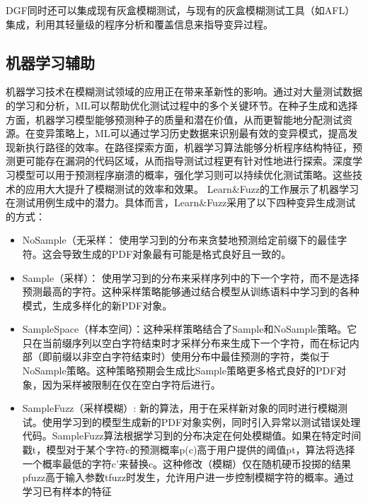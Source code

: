 \documentclass[10.5pt,compsoc]{CjC}
\theoremstyle{mystyle}
\begin{document}
DGF同时还可以集成现有灰盒模糊测试，与现有的灰盒模糊测试工具（如AFL）集成，利用其轻量级的程序分析和覆盖信息来指导变异过程\cite{Böhme}。

\vspace {10mm}

\subsection{机器学习辅助}

机器学习技术在模糊测试领域的应用正在带来革新性的影响。通过对大量测试数据的学习和分析，ML可以帮助优化测试过程中的多个关键环节。在种子生成和选择方面，机器学习模型能够预测种子的质量和潜在价值，从而更智能地分配测试资源。在变异策略上，ML可以通过学习历史数据来识别最有效的变异模式，提高发现新执行路径的效率。在路径探索方面，机器学习算法能够分析程序结构特征，预测更可能存在漏洞的代码区域，从而指导测试过程更有针对性地进行探索。深度学习模型可以用于预测程序崩溃的概率，强化学习则可以持续优化测试策略。这些技术的应用大大提升了模糊测试的效率和效果。 Learn\&Fuzz的工作展示了机器学习在测试用例生成中的潜力。具体而言，Learn\&Fuzz采用了以下四种变异生成测试的方式\cite{Godefroid}：

\begin{itemize}
  
  \item NoSample（无采样： 使用学习到的分布来贪婪地预测给定前缀下的最佳字符。这会导致生成的PDF对象最有可能是格式良好且一致的。
  \item Sample（采样）： 使用学习到的分布来采样序列中的下一个字符，而不是选择预测最高的字符。这种采样策略能够通过结合模型从训练语料中学习到的各种模式，生成多样化的新PDF对象。
  \item SampleSpace（样本空间）：这种采样策略结合了Sample和NoSample策略。它只在当前缀序列以空白字符结束时才采样分布来生成下一个字符，而在标记内部（即前缀以非空白字符结束时）使用分布中最佳预测的字符，类似于NoSample策略。这种策略预期会生成比Sample策略更多格式良好的PDF对象，因为采样被限制在仅在空白字符后进行。
  \item SampleFuzz（采样模糊）: 新的算法，用于在采样新对象的同时进行模糊测试。使用学习到的模型生成新的PDF对象实例，同时引入异常以测试错误处理代码。SampleFuzz算法根据学习到的分布决定在何处模糊值。如果在特定时间戳t，模型对于某个字符c的预测概率p(c)高于用户提供的阈值pt，算法将选择一个概率最低的字符c'来替换c。这种修改（模糊）仅在随机硬币投掷的结果pfuzz高于输入参数tfuzz时发生，允许用户进一步控制模糊字符的概率。通过学习已有样本的特征

\end{itemize}
\end{document}
